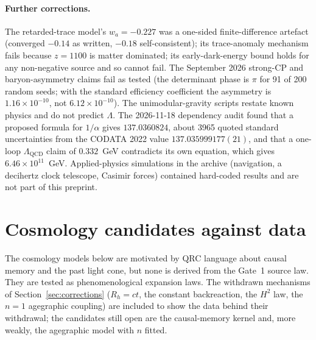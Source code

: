 \documentclass[11pt]{article}
\theoremstyle{definition}
\theoremstyle{remark}
\begin{document}
\paragraph{Further corrections.} The retarded-trace model's $w_a=-0.227$ was a
one-sided finite-difference artefact (converged $-0.14$ as written, $-0.18$
self-consistent); its trace-anomaly mechanism fails because $z=1100$ is matter
dominated; its early-dark-energy bound holds for any non-negative source and so cannot
fail. The September 2026 strong-CP and baryon-asymmetry claims fail as tested (the
determinant phase is $\pi$ for 91 of 200 random seeds; with the standard efficiency
coefficient the asymmetry is $1.16\times10^{-10}$, not $6.12\times10^{-10}$). The
unimodular-gravity scripts restate known physics and do not predict $\Lambda$. The
2026-11-18 dependency audit found that a proposed formula for $1/\alpha$ gives
$137.0360824$, about 3965 quoted standard uncertainties from the CODATA 2022 value
$137.035999177(21)$, and that a one-loop $\Lambda_{\mathrm{QCD}}$ claim of $0.332$~GeV
contradicts its own equation, which gives $6.46\times10^{11}$~GeV. Applied-physics
simulations in the archive (navigation, a decihertz clock telescope, Casimir forces)
contained hard-coded results and are not part of this preprint.

\section{Cosmology candidates against data}
\label{sec:cosmo}

The cosmology models below are motivated by QRC language about causal memory and the
past light cone, but none is derived from the Gate~1 source law. They are tested as
phenomenological expansion laws. The withdrawn mechanisms of
Section~\ref{sec:corrections} ($R_h=ct$, the constant backreaction, the $H^2$ law, the
$n=1$ agegraphic coupling) are included to show the data behind their withdrawal; the
candidates still open are the causal-memory kernel and, more weakly, the agegraphic
model with $n$ fitted.
\end{document}

